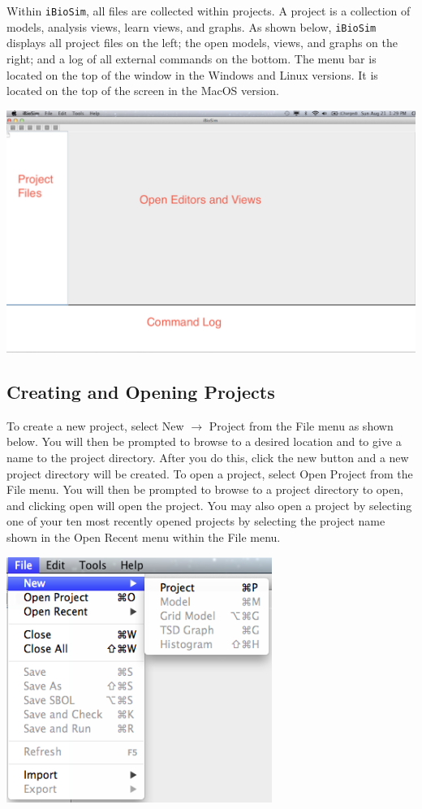 \documentclass[titlepage,11pt]{article}
\begin{document}
\noindent
Within {\tt iBioSim}, all files are collected within projects.   
A project is a collection of models, analysis views, learn views, and graphs.  As shown below, {\tt iBioSim} displays all project files on the left; the open models, views, and graphs on the right; and a log of all external commands on the bottom.  The menu bar is located on the top of the window in the Windows and Linux versions.  It is located on the top of the screen in the MacOS version.

\begin{center}
\includegraphics[width=160mm]{screenshots/iBioSim}
\end{center}

\clearpage

\subsection{Creating and Opening Projects}

\noindent
To create a new project, select New $\rightarrow$ Project from the File menu as shown below.  You will then be prompted to browse to a desired location and to give a name to the project directory.  After you do this, click the new button and a new project directory will be created.  To open a project, select Open Project from the File menu.  You will then be prompted to browse to a project directory to open, and clicking open will open the project. You may also open a project by selecting one of your ten most recently opened projects by selecting the project name shown in the Open Recent menu within the File menu.

\begin{center}
\includegraphics[height=80mm]{screenshots/project}
\end{center}
\end{document}
